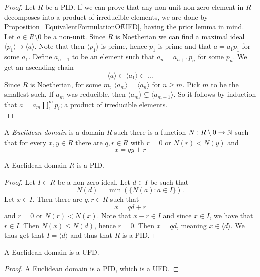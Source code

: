     \begin{proof}
        Let $R$ be a PID. If we can prove that any non-unit non-zero element in $R$ decomposes into a product of irreducible elements, we are done by  Proposition~\ref{EquivalentFormulationOfUFD}, having the prior lemma in mind. Let $a\in R\setminus 0$ be a non-unit. Since $R$ is Noetherian we can find a maximal ideal $\langle p_1\rangle \supset \langle a\rangle$. Note that then $\langle p_1\rangle$ is prime, hence $p_1$ is prime and that $a=a_1p_1$ for some $a_1$. Define $a_{n+1}$ to be an element such that $a_n=a_{n+1}p_n$ for some $p_n$. We get an ascending chain 
        $$\langle a\rangle \subset \langle a_1\rangle \subset \dots$$
        Since $R$ is Noetherian, for some $m$, $\langle a_m\rangle=\langle a_n\rangle $ for $n\geq m$. Pick $m$ to be the smallest such. If $a_m$ was reducible, then $\langle a_m\rangle \subsetneq \langle a_{m+1}\rangle$. So it follows by induction that $a = a_m\prod_1^m p_i$; a product of irreducible elements.\\
    \end{proof}
\begin{definition}
    A \emph{Euclidean domain} is a domain $R$ such there is a function $N: R\setminus 0 \rightarrow \mathbb{N}$ such that for every $x,y\in R$ there are $q,r\in R$ with $r = 0$ or $N(r)<N(y)$ and 
    $$
        x = qy+r
    $$
\end{definition}
\begin{theorem}
    A Euclidean domain $R$ is a PID.
\end{theorem}
\begin{proof}
    Let $I\subset R$ be a non-zero ideal. Let $d\in I$ be such that
    $$
        N(d) = \min(\{N(a):a\in I\}).
    $$
    Let $x\in I$. Then there are $q,r\in R$ such that 
    $$
        x = qd+r
    $$  
    and $r = 0$ or $N(r)<N(x)$. Note that $x-r\in I$ and since $x\in I$, we have that $r\in I$. Then $N(x)\leq N(d)$, hence $r=0$. Then $x=qd$, meaning $x\in \langle d\rangle$. We thus get that $I=\langle d\rangle$ and thus that $R$ is a PID. 
\end{proof}
\begin{corollary}
    A Euclidean domain is a UFD.
\end{corollary}
\begin{proof}
    A Euclidean domain is a PID, which is a UFD. 
\end{proof}
